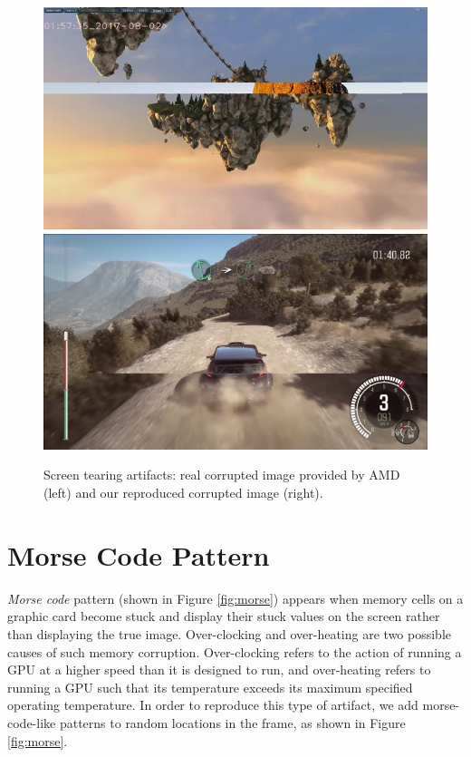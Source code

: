 \begin{figure}[!h]
\includegraphics[scale=0.29735]{images/tearing1.jpg}
\includegraphics[scale=0.627]{images/tearing2.png}
\vspace{5pt}
\caption[Screen tearing artifacts]{Screen tearing artifacts: real corrupted image provided by AMD (left) and our reproduced corrupted image (right).}
\label{fig:tearing}
\end{figure}


\section*{Morse Code Pattern}

\textit{Morse code} pattern (shown in Figure \ref{fig:morse}) appears when memory cells on a graphic card become stuck and display their stuck values on the screen rather than displaying the true image. Over-clocking and over-heating are two possible causes of such memory corruption. Over-clocking refers to the action of running a GPU at a higher speed than it is designed to run, and over-heating refers to running a GPU such that its temperature exceeds its maximum specified operating temperature. In order to reproduce this type of artifact, we add morse-code-like patterns to random locations in the frame, as shown in Figure \ref{fig:morse}.

